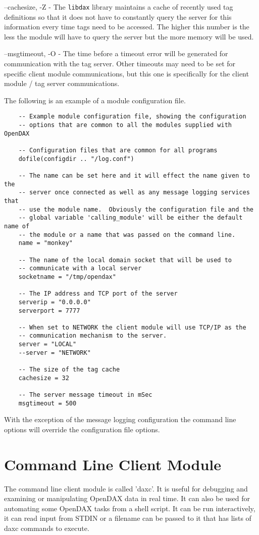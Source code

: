 \begin{list}{}{Command Line Options}
		\item[--cachesize, -Z] - The \texttt{libdax} library maintains a cache of
		recently used tag definitions so that it does not have to constantly query the
		server for this information every time tags need to be accessed.  The higher
		this number is the less the module will have to query the server but the more
		memory will be used.
		\item[--msgtimeout, -O] - The time before a timeout error will be generated for
		communication with the tag server.  Other timeouts may need to be set for
		specific client module communications, but this one is specifically for the
		client module / tag server communications.
	\end{list}
	
	The following is an example of a module configuration file.
	
	\begin{verbatim}
	-- Example module configuration file, showing the configuration
	-- options that are common to all the modules supplied with OpenDAX
	
	-- Configuration files that are common for all programs
	dofile(configdir .. "/log.conf")
	
	-- The name can be set here and it will effect the name given to the
	-- server once connected as well as any message logging services that
	-- use the module name.  Obviously the configuration file and the
	-- global variable 'calling_module' will be either the default name of
	-- the module or a name that was passed on the command line.
	name = "monkey"
	
	-- The name of the local domain socket that will be used to
	-- communicate with a local server
	socketname = "/tmp/opendax"
	
	-- The IP address and TCP port of the server
	serverip = "0.0.0.0"
	serverport = 7777
	
	-- When set to NETWORK the client module will use TCP/IP as the
	-- communication mechanism to the server.
	server = "LOCAL"
	--server = "NETWORK"
	
	-- The size of the tag cache
	cachesize = 32
	
	-- The server message timeout in mSec
	msgtimeout = 500
	\end{verbatim}
	
	With the exception of the message logging configuration the command line options
	will override the configuration file options.
	
	\chapter{Command Line Client Module}
	The command line client module is called 'daxc'.  It is useful for debugging and
	examining or manipulating OpenDAX data in real time.  It can also be used for
	automating some OpenDAX tasks from a shell script.  It can be run interactively,
	it can read input from STDIN or a filename can be passed to it that has lists of
	daxc commands to execute.
	
